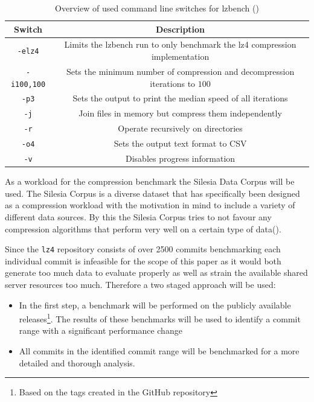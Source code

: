 \documentclass[	runningheads,
				a4paper]{llncs}
\begin{document}
	\begin{table}
		\caption{Overview of used command line switches for lzbench (\cite{gitlzbench})}
		\label{tab:cmd_switches}
		\centering
		\begin{tabular}{|c|c|}
			\hline
			\textbf{Switch} & \textbf{Description}\\
			\hline\hline
			\texttt{-elz4} & Limits the lzbench run to only benchmark the lz4 compression implementation \\
			\hline
			\texttt{-i100,100} & Sets the minimum number of compression and decompression iterations to $100$ \\
			\hline
			\texttt{-p3} & Sets the output to print the median speed of all iterations \\
			\hline
			\texttt{-j} & Join files in memory but compress them independently \\
			\hline
			\texttt{-r} & Operate recursively on directories \\
			\hline 
			\texttt{-o4} & Sets the output text format to CSV \\
			\hline
			\texttt{-v} & Disables progress information \\
			\hline
		\end{tabular}
	\end{table}
	
	As a workload for the compression benchmark the Silesia Data Corpus will be used. The Silesia Corpus is a diverse dataset that has specifically been designed as a compression workload with the motivation in mind to include a variety of different data sources. By this the Silesia Corpus tries to not favour any compression algorithms that perform very well on a certain type of data(\cite{silesia}).

	Since the \texttt{lz4} repository consists of over 2500 commits benchmarking each individual commit is infeasible for the scope of this paper as it would both generate too much data to evaluate properly as well as strain the available shared server resources too much. Therefore a two staged approach will be used:
\begin{itemize}
	\item In the first step, a benchmark will be performed on the publicly available releases\footnote{Based on the tags created in the GitHub repository}. The results of these benchmarks will be used to identify a commit range with a significant performance change
	\item All commits in the identified commit range will be benchmarked for a more detailed and thorough analysis.
\end{itemize}
\end{document}
